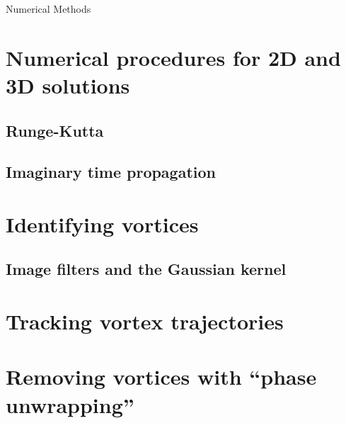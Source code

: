\begin{chapter}{\label{cha:numerics}Numerical Methods}
\section{\label{section:RK} Numerical procedures for 2D and 3D solutions}
	\subsection{\label{section:RK4} Runge-Kutta}
	\subsection{\label{section:RK4} Imaginary time propagation}
\section{\label{section:vortexidentifying} Identifying vortices}
	\subsection{\label{section:gaussianblur} Image filters and the Gaussian kernel}
\section{\label{section:vortextracking} Tracking vortex trajectories}
\section{\label{section:vortexremoval} Removing vortices with ``phase unwrapping''}
\end{chapter}